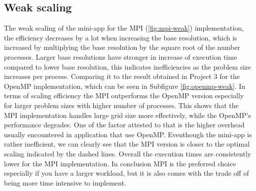 \subsection{Weak scaling}
The weak scaling of the mini-app for the MPI (\ref{fig:mpi-weak}) implementation, the efficiency decreases by a lot when increasing the base resolution, which is increased by multiplying the base resolution by the square root of the number processes. Larger base resolutions have stronger in increase of execution time compared to lower base resolution, this indicates inefficiencies as the problem size increases per process.
\newline
Comparing it to the result obtained in Project 3 for the OpenMP implementation, which can be seen in Subfigure \ref{fig:openmp-weak}. In terms of scaling efficiency the MPI outperforms the OpenMP version especially for larger problem sizes with higher number of processes. This shows that the MPI implementation handles large grid size more effectively, while the OpenMP's performance degrades.
One of the factor attested to that is the higher overhead usually encountered in application that use OpenMP. Eventhough the mini-app is rather inefficient, we can clearly see that the MPI version is closer to the optimal scaling indicated by the dashed lines. Overall the execution times are consistently lower for the MPI implementation. In conclusion MPI is the preferred choice especially if you have a larger workload, but it is also comes with the trade off of being more time intensive to implement.

